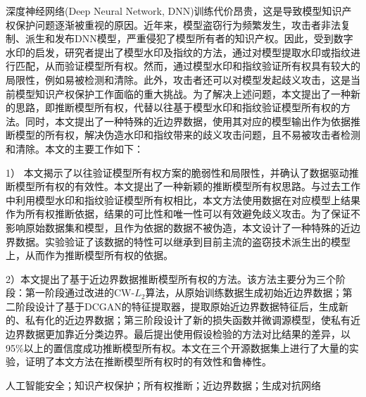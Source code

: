 

\begin{zhaiyao}

深度神经网络(Deep Neural Network, DNN)训练代价昂贵，这是导致模型知识产权保护问题逐渐被重视的原因。近年来，模型盗窃行为频繁发生，攻击者非法复制、派生和发布DNN模型，严重侵犯了模型所有者的知识产权。因此，受到数字水印的启发，研究者提出了模型水印及指纹的方法，通过对模型提取水印或指纹进行匹配，从而验证模型所有权。然而，通过模型水印和指纹验证所有权具有较大的局限性，例如易被检测和清除。此外，攻击者还可以对模型发起歧义攻击，这是当前模型知识产权保护工作面临的重大挑战。为了解决上述问题，本文提出了一种新的思路，即推断模型所有权，代替以往基于模型水印和指纹验证模型所有权的方法。同时，本文提出了一种特殊的近边界数据，使用其对应的模型输出作为依据推断模型的所有权，解决伪造水印和指纹带来的歧义攻击问题，且不易被攻击者检测和清除。本文的主要工作如下：

1） 本文揭示了以往验证模型所有权方案的脆弱性和局限性，并确认了数据驱动推断模型所有权的有效性。本文提出了一种新颖的推断模型所有权思路。与过去工作中利用模型水印和指纹验证模型所有权相比，本文方法使用数据在对应模型上结果作为所有权推断依据，结果的可比性和唯一性可以有效避免歧义攻击。为了保证不影响原始数据集和模型，且作为依据的数据不被伪造，本文设计了一种特殊的近边界数据。实验验证了该数据的特性可以继承到目前主流的盗窃技术派生出的模型上，从而作为推断模型所有权的依据。

2）本文提出了基于近边界数据推断模型所有权的方法。该方法主要分为三个阶段：第一阶段通过改进的CW-$L_2$算法，从原始训练数据生成初始近边界数据；第二阶段设计了基于DCGAN的特征提取器，提取原始近边界数据特征后，生成新的、私有化的近边界数据；第三阶段设计了新的损失函数并微调源模型，使私有近边界数据更加靠近分类边界。最后提出使用假设检验的方法对比结果的差异，以95\%以上的置信度成功推断模型所有权。本文在三个开源数据集上进行了大量的实验，证明了本文方法在推断模型所有权时的有效性和鲁棒性。

\end{zhaiyao}


\begin{guanjianci}	
人工智能安全；知识产权保护；所有权推断；近边界数据；生成对抗网络
\end{guanjianci}



